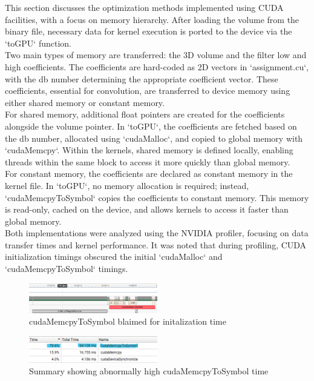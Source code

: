 \documentclass[journal,11pt]{IEEEtran}
\begin{document}
This section discusses the optimization methods implemented using CUDA facilities, with a focus on memory hierarchy. After loading the volume from the binary file, necessary data for kernel execution is ported to the device via the `toGPU` function.\\

Two main types of memory are transferred: the 3D volume and the filter low and high coefficients. The coefficients are hard-coded as 2D vectors in `assignment.cu`, with the db number determining the appropriate coefficient vector. These coefficients, essential for convolution, are transferred to device memory using either shared memory or constant memory.\\

For shared memory, additional float pointers are created for the coefficients alongside the volume pointer. In `toGPU`, the coefficients are fetched based on the db number, allocated using `cudaMalloc`, and copied to global memory with `cudaMemcpy`. Within the kernels, shared memory is defined locally, enabling threads within the same block to access it more quickly than global memory.\\

For constant memory, the coefficients are declared as constant memory in the kernel file. In `toGPU`, no memory allocation is required; instead, `cudaMemcpyToSymbol` copies the coefficients to constant memory. This memory is read-only, cached on the device, and allows kernels to access it faster than global memory.\\

Both implementations were analyzed using the NVIDIA profiler, focusing on data transfer times and kernel performance. It was noted that during profiling, CUDA initialization timings obscured the initial `cudaMalloc` and `cudaMemcpyToSymbol` timings.
\vspace{-1.2em}\\
\begin{figure}[h]
    \centering
    \includegraphics[width=0.5\textwidth]{assets/blaimed-mem.png}
    \caption{cudaMemcpyToSymbol blaimed for initalization time}
    \label{fig:2}
\end{figure}
\vspace{-0.2em}
\begin{figure}[h]
    \centering
    \includegraphics[width=0.5\textwidth]{assets/blaimed-mem-sum.png}
    \caption{Summary showing abnormally high cudaMemcpyToSymbol time}
    \label{fig:3}
\end{figure}
\end{document}
